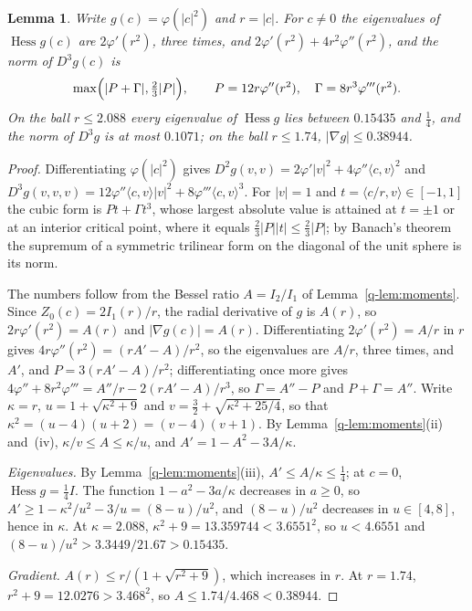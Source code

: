 \documentclass[aps,prd,twocolumn,superscriptaddress,nofootinbib,longbibliography,floatfix,amsmath,amssymb,10pt]{revtex4-2}
\newtheorem{lemma}[theorem]{Lemma}
\theoremstyle{definition}
\theoremstyle{remark}
\newcommand{\Hess}{\operatorname{Hess}}
\newcommand{\ip}[2]{\langle #1,#2\rangle}
\begin{document}
\begin{lemma}\label{lem:vmfconst}
Write $g(c)=\varphi(|c|^2)$ and $r=|c|$. For $c\ne0$ the eigenvalues of
$\Hess g(c)$ are $2\varphi'(r^2)$, three times, and $2\varphi'(r^2)+4r^2
\varphi''(r^2)$, and the norm of $D^3g(c)$ is
\[
\max\Bigl(|P+\Gamma|,\tfrac23|P|\Bigr),\qquad P=12r\varphi''(r^2),\quad
\Gamma=8r^3\varphi'''(r^2).
\]
On the ball $r\le2.088$ every eigenvalue of $\Hess g$ lies between
$0.15435$ and $\frac14$, and the norm of $D^3g$ is at most $0.1071$; on
the ball $r\le1.74$, $|\nabla g|\le0.38944$.
\end{lemma}

\begin{proof}
Differentiating $\varphi(|c|^2)$ gives $D^2g(v,v)=2\varphi'|v|^2+4\varphi''
\ip cv^2$ and $D^3g(v,v,v)=12\varphi''\ip cv|v|^2+8\varphi'''\ip cv^3$. For
$|v|=1$ and $t=\ip{c/r}v\in[-1,1]$ the cubic form is $Pt+\Gamma t^3$, whose
largest absolute value is attained at $t=\pm1$ or at an interior critical
point, where it equals $\frac23|P||t|\le\frac23|P|$; by Banach's
theorem~\cite{Ban38} the supremum of a symmetric trilinear form on the
diagonal of the unit sphere is its norm.

The numbers follow from the Bessel ratio $A=I_2/I_1$ of
Lemma~\ref{q-lem:moments}. Since $Z_0(c)=2I_1(r)/r$, the radial derivative
of $g$ is $A(r)$, so $2r\varphi'(r^2)=A(r)$ and $|\nabla g(c)|=A(r)$.
Differentiating $2\varphi'(r^2)=A/r$ in $r$ gives $4r\varphi''(r^2)=
(rA'-A)/r^2$, so the eigenvalues are $A/r$, three times, and $A'$, and
$P=3(rA'-A)/r^2$; differentiating once more gives $4\varphi''+8r^2\varphi'''
=A''/r-2(rA'-A)/r^3$, so $\Gamma=A''-P$ and $P+\Gamma=A''$. Write
$\kappa=r$, $u=1+\sqrt{\kappa^2+9}$ and $v=\frac32+\sqrt{\kappa^2+25/4}$, so
that $\kappa^2=(u-4)(u+2)=(v-4)(v+1)$. By Lemma~\ref{q-lem:moments}(ii)
and~(iv), $\kappa/v\le A\le\kappa/u$, and $A'=1-A^2-3A/\kappa$.

\emph{Eigenvalues.} By Lemma~\ref{q-lem:moments}(iii), $A'\le A/\kappa\le
\frac14$; at $c=0$, $\Hess g=\frac14I$. The function $1-a^2-3a/\kappa$
decreases in $a\ge0$, so $A'\ge1-\kappa^2/u^2-3/u=(8-u)/u^2$, and
$(8-u)/u^2$ decreases in $u\in[4,8]$, hence in $\kappa$. At $\kappa=2.088$,
$\kappa^2+9=13.359744<3.6551^2$, so $u<4.6551$ and $(8-u)/u^2>3.3449/
21.67>0.15435$.

\emph{Gradient.} $A(r)\le r/(1+\sqrt{r^2+9})$, which increases in $r$. At
$r=1.74$, $r^2+9=12.0276>3.468^2$, so $A\le1.74/4.468<0.38944$.


\end{proof}
\end{document}
